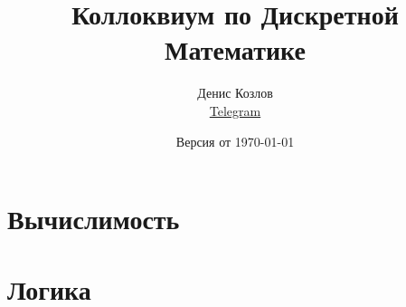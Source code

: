 \documentclass[a4paper, fleqn]{article}
\title{Коллоквиум по Дискретной Математике}
\author{

    Денис Козлов         \\ \href{https://t.me/DKozl50}{Telegram} \and
}
\date{Версия от {\ddmmyyyydate\today} \currenttime}
\begin{document}
    \maketitle

    \section*{Вычислимость}


























    \section*{Логика}







\end{document}
